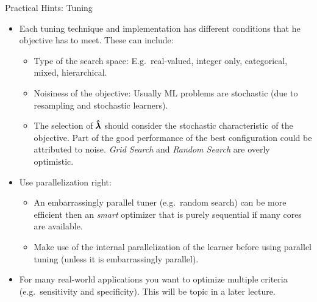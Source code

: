 \begin{frame}[allowframebreaks]{Practical Hints: Tuning}
\begin{itemize}
  \item Each tuning technique and implementation has different conditions that he objective has to meet. These can include:
  \begin{itemize}
    \item Type of the search space: E.g.\ real-valued, integer only, categorical, mixed, hierarchical.
    \item Noisiness of the objective: Usually ML problems are stochastic (due to resampling and stochastic learners).
    \item The selection of $\pmb{\hat{\lambda}}$ should consider the stochastic characteristic of the objective. Part of the good performance of the best configuration could be attributed to noise. \emph{Grid Search} and \emph{Random Search} are overly optimistic.
  \end{itemize}

  \item Use parallelization right:
  \begin{itemize}
    \item An embarrassingly parallel tuner (e.g.\ random search) can be more efficient then an \emph{smart} optimizer that is purely sequential if many cores are available.
    \item Make use of the internal parallelization of the learner before using parallel tuning (unless it is embarrassingly parallel).
  \end{itemize}
  
  \item For many real-world applications you want to optimize multiple criteria (e.g.\ sensitivity and specificity). This will be topic in a later lecture.
\end{itemize}
\end{frame}


